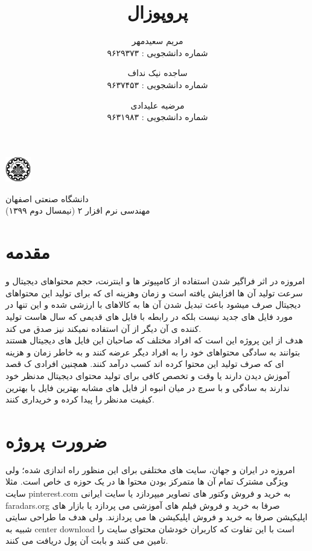 \documentclass{article}
\title{پروپوزال}
\author{
	مریم سعیدمهر \\
	شماره دانشجویی : ۹۶۲۹۳۷۳
	\and
	ساجده نیک نداف \\
	شماره دانشجویی : ۹۶۳۷۴۵۳
	\and
	مرضیه علیدادی \\
	شماره دانشجویی : ۹۶۳۱۹۸۳
}
\begin{document}
	
	\begin{minipage}{0.1\textwidth}
		\includegraphics[width=1.1cm]{Pic/IUT.png}
	\end{minipage}
	\hfill
	\begin{minipage}{0.9\textwidth}\raggedleft
		دانشگاه صنعتی اصفهان\\
		مهندسی نرم افزار ۲ (نیمسال دوم ۱۳۹۹)\\
	\end{minipage}
	
	\makepertitle
	\tableofcontents
	\cleardoublepage
	\section{مقدمه}
	امروزه در اثر فراگیر شدن استفاده از کامپیوتر ها و اینترنت، حجم محتواهای دیجیتال و سرعت تولید آن ها افزایش یافته است و زمان وهزینه ای که برای تولید این محتواهای دیجیتال صرف میشود باعث تبدیل شدن آن ها به کالاهای با ارزشی شده و این تنها در مورد فایل های جدید نیست بلکه در رابطه با فایل های قدیمی که سال هاست تولید کننده ی آن دیگر از آن استفاده نمیکند نیز صدق می کند. \\
	هدف از این پروژه این است که افراد مختلف که صاحبان این فایل های دیجیتال هستند بتوانند به سادگی محتواهای خود را به افراد دیگر عرضه کنند و به خاطر زمان و هزینه ای که صرف تولید این محتوا کرده اند کسب درآمد کنند. همچنین افرادی ک قصد آموزش دیدن دارند یا وقت و تخصص کافی برای تولید محتوای دیجیتال مدنظر خود ندارند به سادگی و با سرچ در میان انبوه از فایل های مشابه بهترین فایل با بهترین کیفیت مدنظر را پیدا کرده و خریداری کنند.
	
	\section{ضرورت پروژه}
	امروزه در ایران و جهان، سایت های مختلفی برای این منظور راه اندازی شده؛ ولی ویژگی مشترک تمام آن ها متمرکز بودن محتوا ها در یک  حوزه ی خاص است. مثلا سایت pinterest.com به خرید و فروش وکتور های تصاویر میپردازد یا سایت ایرانی faradars.org صرفا به خرید و فروش فیلم های آموزشی می پردازد یا بازار های اپلیکیشن صرفا به خرید و فروش اپلیکیشن ها می پردازند. ولی هدف ما طراحی سایتی شبیه به center download است با این تفاوت که کاربران خودشان محتوای سایت را تامین می کنند و بابت آن پول دریافت می کنند.
	
\end{document}
